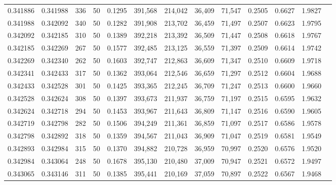 \begin{tabular}{rrrrrrrrrrrrr}
0.341886 & 0.341988 &   336 &  50 &                                     0.1295 & 391,568 & 214,042 &  36,409 &  71,547 & 0.2505 & 0.6627 & 1.9827 \\
0.341988 & 0.342092 &   340 &  50 &                                     0.1282 & 391,908 & 213,702 &  36,459 &  71,497 & 0.2507 & 0.6623 & 1.9795 \\
0.342092 & 0.342185 &   310 &  50 &                                     0.1389 & 392,218 & 213,392 &  36,509 &  71,447 & 0.2508 & 0.6618 & 1.9767 \\
0.342185 & 0.342269 &   267 &  50 &                                     0.1577 & 392,485 & 213,125 &  36,559 &  71,397 & 0.2509 & 0.6614 & 1.9742 \\
0.342269 & 0.342340 &   262 &  50 &                                     0.1603 & 392,747 & 212,863 &  36,609 &  71,347 & 0.2510 & 0.6609 & 1.9718 \\
0.342341 & 0.342433 &   317 &  50 &                                     0.1362 & 393,064 & 212,546 &  36,659 &  71,297 & 0.2512 & 0.6604 & 1.9688 \\
0.342433 & 0.342528 &   301 &  50 &                                     0.1425 & 393,365 & 212,245 &  36,709 &  71,247 & 0.2513 & 0.6600 & 1.9660 \\
0.342528 & 0.342624 &   308 &  50 &                                     0.1397 & 393,673 & 211,937 &  36,759 &  71,197 & 0.2515 & 0.6595 & 1.9632 \\
0.342624 & 0.342718 &   294 &  50 &                                     0.1453 & 393,967 & 211,643 &  36,809 &  71,147 & 0.2516 & 0.6590 & 1.9605 \\
0.342719 & 0.342798 &   282 &  50 &                                     0.1506 & 394,249 & 211,361 &  36,859 &  71,097 & 0.2517 & 0.6586 & 1.9578 \\
0.342798 & 0.342892 &   318 &  50 &                                     0.1359 & 394,567 & 211,043 &  36,909 &  71,047 & 0.2519 & 0.6581 & 1.9549 \\
0.342893 & 0.342984 &   315 &  50 &                                     0.1370 & 394,882 & 210,728 &  36,959 &  70,997 & 0.2520 & 0.6576 & 1.9520 \\
0.342984 & 0.343064 &   248 &  50 &                                     0.1678 & 395,130 & 210,480 &  37,009 &  70,947 & 0.2521 & 0.6572 & 1.9497 \\
0.343065 & 0.343146 &   311 &  50 &                                     0.1385 & 395,441 & 210,169 &  37,059 &  70,897 & 0.2522 & 0.6567 & 1.9468 \\

\end{tabular}
